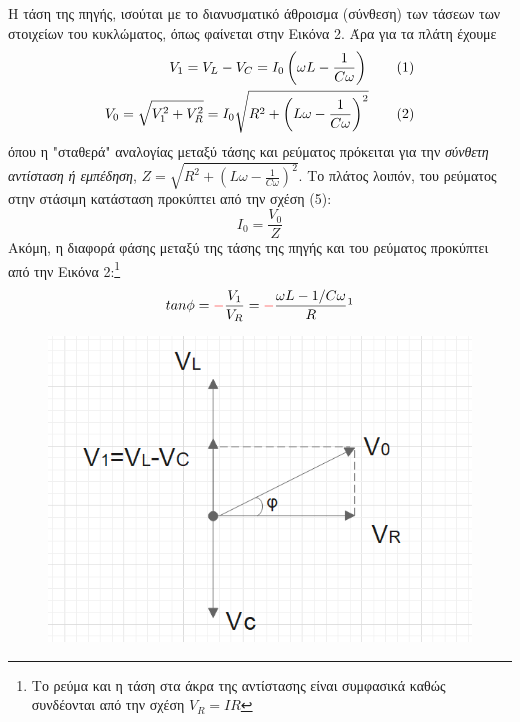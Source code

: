 \documentclass[a4paper]{article}
\newcommand\numberthis{\addtocounter{equation}{1}\tag{\theequation}}
\begin{document}
Η τάση της πηγής, ισούται με το διανυσματικό άθροισμα (σύνθεση) των τάσεων των στοιχείων του κυκλώματος, όπως φαίνεται στην Εικόνα 2.  Άρα για τα πλάτη έχουμε 
\begin{align*}\label{5}
V_1=V_L -V_C=I_0\left( \omega L - \frac{1}{C\omega}\right) \numberthis \\ 
V_0 = \sqrt{V_1^2+V_R^2} = I_0\sqrt{R^2+\left(L\omega-\frac{1}{C\omega}\right)^2} \numberthis 
\end{align*}
όπου η "σταθερά" αναλογίας μεταξύ τάσης και ρεύματος πρόκειται για την \textit{σύνθετη αντίσταση ή εμπέδηση}, $Z=\sqrt{R^2+\left(L\omega-\frac{1}{C\omega}\right)^2}$. Το πλάτος λοιπόν, του ρεύματος στην στάσιμη κατάσταση προκύπτει από την σχέση (5): 
\begin{equation}\label{9}
I_0 = \frac{V_0}{Z}
\end{equation}
Ακόμη, η διαφορά φάσης μεταξύ της τάσης της πηγής και του ρεύματος προκύπτει από την Εικόνα 2:\footnote{Το ρεύμα και η τάση στα άκρα της αντίστασης είναι συμφασικά καθώς συνδέονται από την σχέση $V_R=I  R$} 
\begin{equation}
tan\phi = \textcolor{red}{-}\frac{V_1}{V_R} = \textcolor{red}{-}\frac{\omega L - 1/C\omega}{R} \footnotemark
\end{equation}
\begin{figure}
\centering
\caption{}
\includegraphics[scale=0.4]{coupled.png}
\end{figure}
\end{document}
